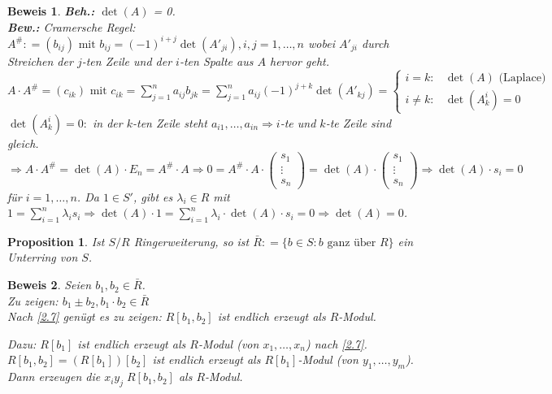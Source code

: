 \documentclass[a4paper,12pt]{scrbook}
\theoremstyle{break}
\newtheorem{Prop}[Def]{Proposition}
\theoremstyle{nonumberbreak}
\newtheorem{Bew}{Beweis}
\theoremstyle{nonumberplain}
\newcommand{\defeqr}[0]{\mathrel{\mathop:}=}
\begin{document}
\begin{Bew}
  \textbf{Beh.:} $\det(A)$ = 0.\\
  \textbf{Bew.:} Cramersche Regel:\\
  $A^{\#} \defeqr (b_{i j}) \text{ mit } b_{i j} = (-1)^{i+j} \det(A'_{j
  i}), i,j= 1, \dots, n$ wobei $A'_{j i}$ durch Streichen der $j$-ten Zeile und
  der $i$-ten Spalte aus $A$ hervor geht.\\
  $A \cdot A^{\#} = (c_{i k}) \text{ mit } c_{i k} = \sum_{j = 1}^n a_{i j} b_{j
  k} = \sum_{j = 1}^n a_{i j} (-1)^{j+k} \det(A'_{k j}) = \begin{cases}
  i=k: & \det(A) \text{ (Laplace)}\\
  i \not= k: & \det(A_k^i) = 0
  \end{cases}$\\
  $\det(A_k^i) = 0:$ in der $k$-ten Zeile steht $a_{i 1}, \dots , a_{i n}
  \Rightarrow i$-te und $k$-te Zeile sind gleich.\\
  $\Rightarrow A \cdot A^{\#} = \det(A) \cdot E_n = A^{\#} \cdot A
  \Rightarrow 0 = A^{\#} \cdot A \cdot \begin{pmatrix}s_1 \\ \vdots \\ s_n 
  \end{pmatrix} = \det(A) \cdot \begin{pmatrix}s_1 \\ \vdots \\ s_n 
  \end{pmatrix} \Rightarrow \det(A) \cdot s_i = 0$ für $i = 1, \dots,
  n$.
  Da $1 \in S'$, gibt es $\lambda_i \in R$ mit $1 = \sum_{i=1}^n \lambda_i s_i
  \Rightarrow \det(A) \cdot 1 = \sum_{i=1}^n \lambda_i \cdot \det(A)
  \cdot s_i = 0 \Rightarrow \det(A) = 0$.
\end{Bew}

\begin{Prop}
\label{2.8}
  Ist $S/R$ Ringerweiterung, so ist $\bar{R} \defeqr \{ b \in S: b \text{ ganz 
  über } R \}$ ein Unterring von $S$.
\end{Prop}

\begin{Bew} 
  Seien $b_1, b_2 \in \bar{R}$.\\
  Zu zeigen: $b_1 \pm b_2, b_1 \cdot b_2 \in \bar{R}$\\
  Nach \ref{2.7} genügt es zu zeigen: $R[b_1, b_2]$ ist endlich erzeugt als
  $R$-Modul.

  Dazu: $R[b_1]$ ist endlich erzeugt als $R$-Modul (von $x_1, \dots, x_n$) nach
  \ref{2.7}.  $R[b_1, b_2] = (R[b_1])[b_2]$ ist endlich erzeugt als
  $R[b_1]$-Modul (von $y_1, \dots, y_m$).  Dann erzeugen die $x_i y_j \; R[b_1,
  b_2]$ als $R$-Modul.
\end{Bew}
\end{document}
